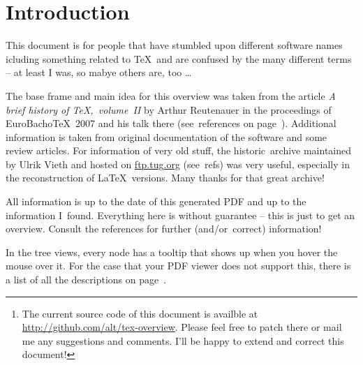 


\begin{abstract}
In the world of \TeX, there are many developments and ambiguous names. This paper tries to give an overview of the development of \TeX\ and related programs. Contributions are very welcome!\footnote{The current source code of this document is availble at \url{http://github.com/alt/tex-overview}. Please feel free to patch there or mail me any suggestions and comments. I'll be happy to extend and correct this document!}

{\centering \Large \hyperref[textextview]{Link for the impatient.}\\[2ex]}
\end{abstract}

\section*{Introduction}
This document is for people that have stumbled upon different software names icluding something related to \TeX\ and are confused by the many different terms – at least I was, so mabye others are, too … 

The base frame and main idea for this overview was taken from the article \textit{A brief history of \TeX,~volume~II} by Arthur Reutenauer in the proceedings of \textsf{EuroBacho\TeX~2007} and his talk there (see~references on page~\pageref{sec:refs}). Additional information is taken from original documentation of the software and some review articles. For information of very old stuff, the \textsf{historic~archive} maintained by Ulrik Vieth and hosted on \url{ftp.tug.org} (see~refs) was very useful, especially in the reconstruction of \LaTeX\ versions. Many thanks for that great archive!

All information is up to the date of this generated PDF and up to the information I~found. Everything here is without guarantee – this is just to get an overview. Consult the references for further (and/or~correct) information! 

In the tree views, every node has a tooltip that shows up when you hover the mouse over it. For the case that your PDF viewer does not support this, there is a list of all the descriptions on page~\pageref{sec:text}.

